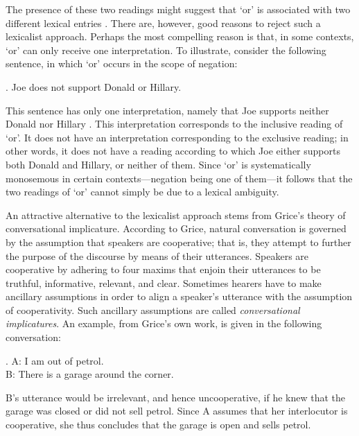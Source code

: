 \documentclass[12pt]{article}
\begin{document}
The presence of these two readings might suggest that `or' is associated with two different lexical entries \citep[e.g.,][]{basson1960, baum1996, rescher1964}. There are, however, good reasons to reject such a lexicalist approach. Perhaps the most compelling reason is that, in some contexts, `or' can only receive one interpretation. To illustrate, consider the following sentence, in which `or' occurs in the scope of negation:

\ex.	 Joe does not support Donald or Hillary.

This sentence has only one interpretation, namely that Joe supports neither Donald nor Hillary \citep[cf.][]{crain2008}. This interpretation corresponds to the inclusive reading of `or'. It does not have an interpretation corresponding to the exclusive reading; in other words, it does not have a reading according to which Joe either supports both Donald and Hillary, or neither of them. Since `or' is systematically monosemous in certain contexts---negation being one of them---it follows that the two readings of `or' cannot simply be due to a lexical ambiguity.

An attractive alternative to the lexicalist approach stems from Grice's \citeyearpar{grice1975} theory of conversational implicature. According to Grice, natural conversation is governed by the assumption that speakers are cooperative; that is, they attempt to further the purpose of the discourse by means of their utterances. Speakers are cooperative by adhering to four maxims that enjoin their utterances to be truthful, informative, relevant, and clear. Sometimes hearers have to make ancillary assumptions in order to align a speaker's utterance with the assumption of cooperativity. Such ancillary assumptions are called \emph{conversational implicatures}. An example, from Grice's own work, is given in the following conversation:

\ex.	A: I am out of petrol. \\
 B: There is a garage around the corner.
	
B's utterance would be irrelevant, and hence uncooperative, if he knew that the garage was closed or did not sell petrol. Since A assumes that her interlocutor is cooperative, she thus concludes that the garage is open and sells petrol.
\end{document}
